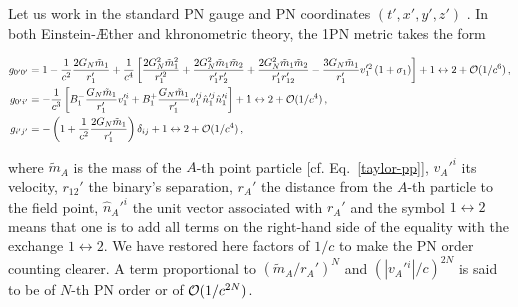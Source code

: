 \documentclass[prd,aps,twocolumn,nofootinbib,showpacs,superscriptaddress]{revtex4-1}
\newcommand\bw{\begin{widetext}}
\newcommand\ew{\end{widetext}}
\begin{document}
Let us work in the standard PN gauge and PN coordinates $(t',x',y',z')$ \cite{TEGP}. In both Einstein-\AE ther and khronometric theory, the 1PN metric takes the form 
%
\allowdisplaybreaks
\bw 
\begin{align}
\label{g00PN}
g_{0'0'} &= 1 - \frac{1}{c^2} \frac{2 G_{N} \tilde{m}_{1}}{r_{1}'} + \frac{1}{c^{4}} \left[ \frac{2 G_{N}^{2} \tilde{m}_{1}^{2}}{r_{1}'^{2}} + \frac{2 G_{N}^{2} \tilde{m}_{1} \tilde{m}_{2}}{r_{1}' r_{2}'} + \frac{2 G_{N}^{2} \tilde{m}_{1} \tilde{m}_{2}}{r_{1}' r_{12}'} - \frac{3 G_{N} \tilde{m}_{1}}{r_{1}'} v_{1}'^{2} \left(1 + \sigma_{1}\right) \right]+ 1 \leftrightarrow 2 + {\cal{O}}(1/c^{6})\,,
\\
\label{g0iPN}
g_{0'i'} &= -\frac{1}{c^{3}} \left[B_{1}^{-} \frac{G_{N} \tilde{m}_{1}}{r_{1}'} v_{1}'^{i} + B_{1}^{+} \frac{G_{N} \tilde{m}_{1}}{r_{1}'} v_{1}'^{j}\hat n_{1}'^{j} \hat n_{1}'^{i} \right]+ 1 \leftrightarrow 2 + {\cal{O}}(1/c^{4})\,,
\\
\label{gijPN}
g_{i'j'} &= -\left(1 + \frac{1}{c^{2}} \frac{2 G_{N} \tilde{m}_{1}}{r_{1}'}\right) \delta_{ij} + 1 \leftrightarrow 2 + {\cal{O}}(1/c^{4})\,,
\end{align}
\ew
%
where $\tilde{m}_{A}$ is the mass of the $A$-th point particle [cf. Eq.~\eqref{taylor-pp}], $v_A'^i$ its velocity, $r_{12}'$ the binary's separation, $r_{A}'$ the distance from the $A$-th particle to the field point, $\hat n_{A}'^{i}$ the unit vector associated with $r_{A}'$ and the symbol $1 \leftrightarrow 2$ means that one is to add all terms on the right-hand side of the equality with the exchange $1 \leftrightarrow 2$. We have restored here factors of $1/c$ to make the PN order counting clearer. A term proportional to $(\tilde{m}_{A}/r_{A}')^{N}$ and $(|v_{A}'{}^{i}|/c)^{2N}$ is said to be of $N$-th PN order or of ${\cal{O}}(1/c^{2N})$. 
\end{document}
